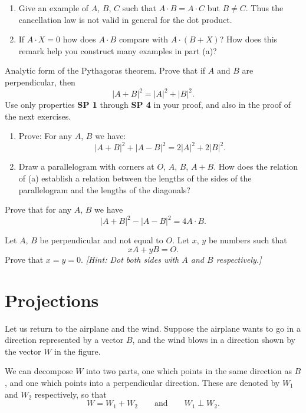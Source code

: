 \documentclass[12pt]{book} %
\begin{document}
\begin{ExerciseList}
\begin{ExerciseList}
\Exercise
\begin{enumerate}
\item[(a)] Give an example of $A$, $B$, $C$ such that $A\cdot B=A\cdot C$ but $B\ne C$. Thus the cancellation law is not valid in general for the dot product.
\item[(b)] If $A\cdot X=0$ how does $A\cdot B$ compare with $A\cdot(B+X)$? How does this remark help you construct many examples in part (a)?
\end{enumerate}

\Exercise Analytic form of the Pythagoras theorem. Prove that if $A$ and $B$ are perpendicular, then
\[
|A+B|^2=|A|^2+|B|^2.
\]
Use only properties \textbf{SP 1} through \textbf{SP 4} in your proof, and also in the proof of the next exercises.

\Exercise
\begin{enumerate}
\item[(a)] Prove: For any $A$, $B$ we have:
\[
|A+B|^2+|A-B|^2=2|A|^2+2|B|^2.
\]
\item[(b)] Draw a parallelogram with corners at $O$, $A$, $B$, $A+B$. How does the relation of (a) establish a relation between the lengths of the sides of the parallelogram and the lengths of the diagonals?
\end{enumerate}

\Exercise Prove that for any $A$, $B$ we have
\[
|A+B|^2-|A-B|^2=4A\cdot B.
\]

\Exercise Let $A$, $B$ be perpendicular and not equal to $O$. Let $x$, $y$ be numbers such that
\[
xA+yB=O.
\]
Prove that $x=y=0$. \textit{[Hint: Dot both sides with $A$ and $B$ respectively.]}
\end{ExerciseList}

\section{Projections}

Let us return to the airplane and the wind. Suppose the airplane wants to go in a direction represented by a vector $B$, and the wind blows in a direction shown by the vector $W$ in the figure.


We can decompose $W$ into two parts, one which points in the same direction as $B$, and one which points into a perpendicular direction. These are denoted by $W_1$ and $W_2$ respectively, so that
\[
W=W_1+W_2
\qquad \text{and} \qquad
W_1\perp W_2.
\]


\end{ExerciseList}
\end{document}
